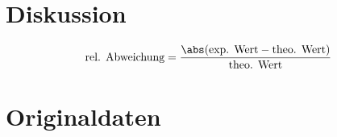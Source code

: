 \section{Diskussion}
\label{sec:Diskussion}
$$\text{rel. Abweichung} = \frac{\abs(\text{exp. Wert} - \text{theo. Wert})}{\text{theo. Wert}}$$
\section{Originaldaten}
\label{sec:Originaldaten}
